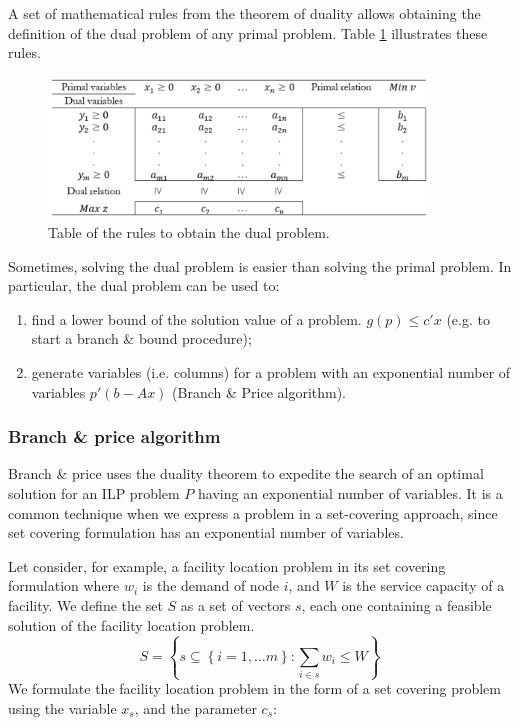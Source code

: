 A set of mathematical rules from the theorem of duality allows obtaining the definition of the dual problem of any primal problem. Table \ref{tab_duality} illustrates these rules.

\begin{figure}[hbt!]
\centering
\includegraphics[width=0.9\textwidth]{SectionLetsMath/prescriptive_fig/tab_duality.png}
\captionsetup{type=table}
\caption{Table of the rules to obtain the dual problem.}
\label{tab_duality}
\end{figure}

Sometimes, solving the dual problem is easier than solving the primal problem. In particular, the dual problem can be used to:
\begin{enumerate}
    \item find a lower bound of the solution value of a problem. $g\left(p\right)\le c\prime x$ (e.g. to start a branch \& bound procedure);
    \item generate variables (i.e. columns) for a problem with an exponential number of variables $p\prime\left(b-Ax\right)$ (Branch \& Price algorithm).
\end{enumerate}

\subsubsection{Branch \& price algorithm}
Branch \& price uses the duality theorem to expedite the search of an optimal solution for an ILP problem $P$ having an exponential number of variables. It is a common technique when we express a problem in a set-covering approach, since set covering formulation has an exponential number of variables.\par
Let consider, for example, a facility location problem in its set covering formulation where $w_i$ is the demand of node $i$, and $W$ is the service capacity of a facility. We define the set $S$ as a set of vectors $s$, each one containing a feasible solution of the facility location problem.
\begin{equation}
S=\left\{s\subseteq\left\{i=1,\ldots m\right\}:\sum_{i\in s}{w_i\le W}\right\}
\label{eq_dualProblemSetS}
\end{equation}
We formulate the facility location problem in the form of a set covering problem using  the variable $x_s$, and the parameter $c_s$:

